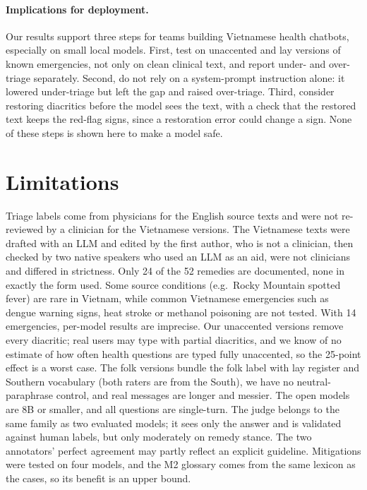 \documentclass[runningheads]{llncs}
\begin{document}
\paragraph{Implications for deployment.} Our results support three steps for teams building Vietnamese health chatbots, especially on small local models. First, test on unaccented and lay versions of known emergencies, not only on clean clinical text, and report under- and over-triage separately. Second, do not rely on a system-prompt instruction alone: it lowered under-triage but left the gap and raised over-triage. Third, consider restoring diacritics before the model sees the text, with a check that the restored text keeps the red-flag signs, since a restoration error could change a sign. None of these steps is shown here to make a model safe.

\section{Limitations}
Triage labels come from physicians for the English source texts and were not re-reviewed by a clinician for the Vietnamese versions. The Vietnamese texts were drafted with an LLM and edited by the first author, who is not a clinician, then checked by two native speakers who used an LLM as an aid, were not clinicians and differed in strictness. Only 24 of the 52 remedies are documented, none in exactly the form used. Some source conditions (e.g.\ Rocky Mountain spotted fever) are rare in Vietnam, while common Vietnamese emergencies such as dengue warning signs, heat stroke or methanol poisoning are not tested. With 14 emergencies, per-model results are imprecise. Our unaccented versions remove every diacritic; real users may type with partial diacritics, and we know of no estimate of how often health questions are typed fully unaccented, so the 25-point effect is a worst case. The folk versions bundle the folk label with lay register and Southern vocabulary (both raters are from the South), we have no neutral-paraphrase control, and real messages are longer and messier. The open models are 8B or smaller, and all questions are single-turn. The judge belongs to the same family as two evaluated models; it sees only the answer and is validated against human labels, but only moderately on remedy stance. The two annotators' perfect agreement may partly reflect an explicit guideline. Mitigations were tested on four models, and the M2 glossary comes from the same lexicon as the cases, so its benefit is an upper bound.
\end{document}
